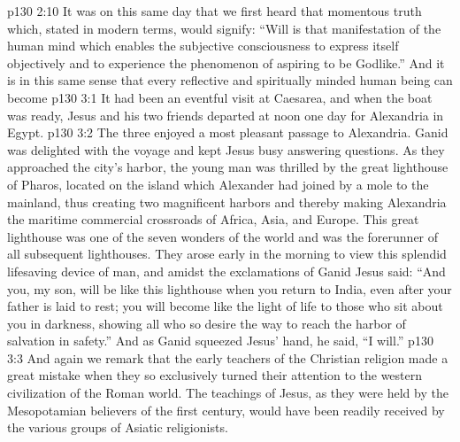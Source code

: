 \pc \vs p130 2:10 It was on this same day that we first heard that momentous truth which, stated in modern terms, would signify: “Will is that manifestation of the human mind which enables the subjective consciousness to express itself objectively and to experience the phenomenon of aspiring to be Godlike.” And it is in this same sense that every reflective and spiritually minded human being can become 
\vs p130 3:1 It had been an eventful visit at Caesarea, and when the boat was ready, Jesus and his two friends departed at noon one day for Alexandria in Egypt.
\vs p130 3:2 The three enjoyed a most pleasant passage to Alexandria. Ganid was delighted with the voyage and kept Jesus busy answering questions. As they approached the city’s harbor, the young man was thrilled by the great lighthouse of Pharos, located on the island which Alexander had joined by a mole to the mainland, thus creating two magnificent harbors and thereby making Alexandria the maritime commercial crossroads of Africa, Asia, and Europe. This great lighthouse was one of the seven wonders of the world and was the forerunner of all subsequent lighthouses. They arose early in the morning to view this splendid lifesaving device of man, and amidst the exclamations of Ganid Jesus said: \textcolor{ubdarkred}{“And you, my son, will be like this lighthouse when you return to India, even after your father is laid to rest; you will become like the light of life to those who sit about you in darkness, showing all who so desire the way to reach the harbor of salvation in safety.”} And as Ganid squeezed Jesus’ hand, he said, “I will.”\plusone
\pc \vs p130 3:3 And again we remark that the early teachers of the Christian religion made a great mistake when they so exclusively turned their attention to the western civilization of the Roman world. The teachings of Jesus, as they were held by the Mesopotamian believers of the first century, would have been readily received by the various groups of Asiatic religionists.
